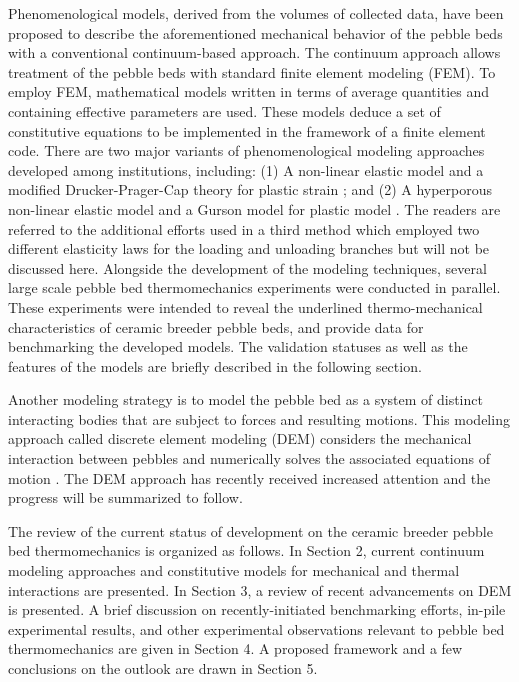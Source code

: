 Phenomenological models, derived from the volumes of collected data, have been proposed to describe the aforementioned mechanical behavior of the pebble beds with a conventional continuum-based approach. The continuum approach allows treatment of the pebble beds with standard finite element modeling (FEM). To employ FEM, mathematical models written in terms of average quantities and containing effective parameters are used. These models deduce a set of constitutive equations to be implemented in the framework of a finite element code.  There are two major variants of phenomenological modeling approaches developed among institutions, including: (1) A non-linear elastic model and a modified Drucker-Prager-Cap theory for plastic strain \cite{Gan2007189,fokkens2003}; and (2) A hyperporous non-linear elastic model and a Gurson model for plastic model \cite{DellOrco:2007hc,DellOrco:2010zr,DiMaio20081287}. The readers are referred to the additional efforts used in a third method\cite{fokkens2003} which employed two different elasticity laws for the loading and unloading branches but will not be discussed here. Alongside the development of the modeling techniques, several large scale pebble bed thermomechanics experiments were conducted in parallel. These experiments were intended to reveal the underlined thermo-mechanical characteristics of ceramic breeder pebble beds, and provide data for benchmarking the developed models.   The validation statuses as well as the features of the models are briefly described in the following section. 

Another modeling strategy is to model the pebble bed as a system of distinct interacting bodies that are subject to forces and resulting motions. This modeling approach called discrete element modeling (DEM) considers the mechanical interaction between pebbles and numerically solves the associated equations of motion \cite{An20072233,An20071393,Gan:2010uq,Gan20101782}. The DEM approach has recently received increased attention and the progress will be summarized to follow.

The review of the current status of development on the ceramic breeder pebble bed thermomechanics is organized as follows. In Section 2, current continuum modeling approaches and constitutive models for mechanical and thermal interactions are presented. In Section 3, a review of recent advancements on DEM is presented. A brief discussion on recently-initiated benchmarking efforts, in-pile experimental results, and other experimental observations relevant to pebble bed thermomechanics are given in Section 4. A proposed framework and a few conclusions on the outlook are drawn in Section 5. 



